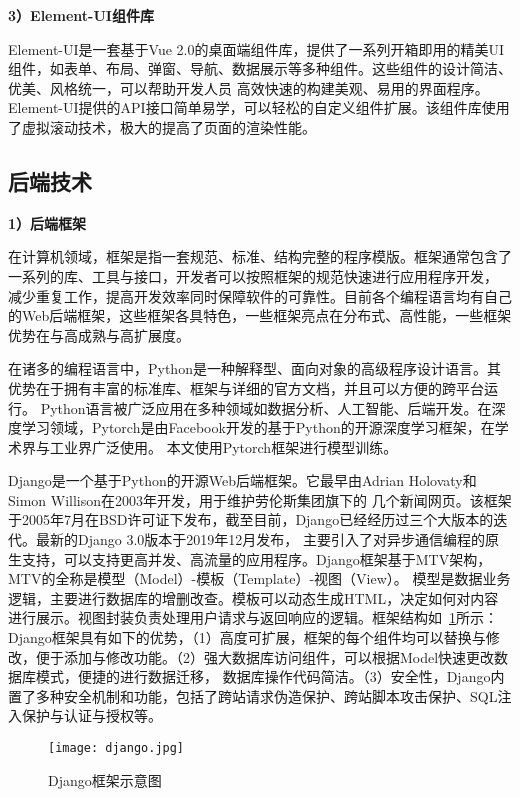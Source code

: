 \textbf{3）Element-UI组件库}

Element-UI是一套基于Vue 2.0的桌面端组件库，提供了一系列开箱即用的精美UI组件，如表单、布局、弹窗、导航、数据展示等多种组件。这些组件的设计简洁、优美、风格统一，可以帮助开发人员 
高效快速的构建美观、易用的界面程序。Element-UI提供的API接口简单易学，可以轻松的自定义组件扩展。该组件库使用了虚拟滚动技术，极大的提高了页面的渲染性能。

\subsection{后端技术}

\textbf{1）后端框架}

在计算机领域，框架是指一套规范、标准、结构完整的程序模版。框架通常包含了一系列的库、工具与接口，开发者可以按照框架的规范快速进行应用程序开发，
减少重复工作，提高开发效率同时保障软件的可靠性。目前各个编程语言均有自己的Web后端框架，这些框架各具特色，一些框架亮点在分布式、高性能，一些框架优势在与高成熟与高扩展度。

在诸多的编程语言中，Python是一种解释型、面向对象的高级程序设计语言。其优势在于拥有丰富的标准库、框架与详细的官方文档，并且可以方便的跨平台运行。
Python语言被广泛应用在多种领域如数据分析、人工智能、后端开发。在深度学习领域，Pytorch是由Facebook开发的基于Python的开源深度学习框架，在学术界与工业界广泛使用。
本文使用Pytorch框架进行模型训练。

Django\cite{rubio2017beginning}是一个基于Python的开源Web后端框架。它最早由Adrian Holovaty和Simon Willison在2003年开发，用于维护劳伦斯集团旗下的
几个新闻网页。该框架于2005年7月在BSD许可证下发布，截至目前，Django已经经历过三个大版本的迭代。最新的Django 3.0版本于2019年12月发布，
主要引入了对异步通信编程的原生支持，可以支持更高并发、高流量的应用程序。Django框架基于MTV架构，MTV的全称是模型（Model）-模板（Template）-视图（View）。
模型是数据业务逻辑，主要进行数据库的增删改查。模板可以动态生成HTML，决定如何对内容进行展示。视图封装负责处理用户请求与返回响应的逻辑。框架结构如~\ref{fig:django}所示：
Django框架具有如下的优势，（1）高度可扩展，框架的每个组件均可以替换与修改，便于添加与修改功能。（2）强大数据库访问组件，可以根据Model快速更改数据库模式，便捷的进行数据迁移，
数据库操作代码简洁。（3）安全性，Django内置了多种安全机制和功能，包括了跨站请求伪造保护、跨站脚本攻击保护、SQL注入保护与认证与授权等。

\begin{figure}[htbp]
  \centering
  \texttt{[image: django.jpg]}
  \caption{Django框架示意图}
  \label{fig:django}
\end{figure}



